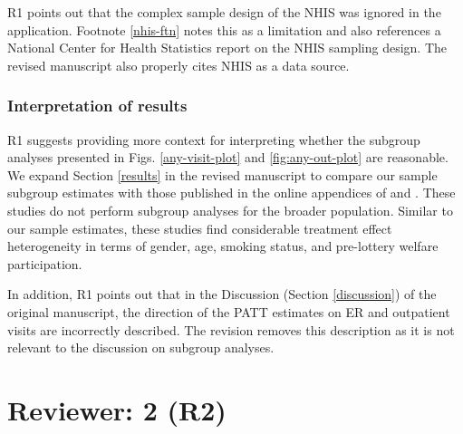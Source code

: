 \documentclass[hidelinks,12pt,letterpaper]{article}
\begin{document}
R1 points out that the complex sample design of the NHIS was ignored in the application. Footnote \ref{nhis-ftn} notes this as a limitation and also references a National Center for Health Statistics report on the NHIS sampling design. The revised manuscript also properly cites NHIS as a data source. 

\subsubsection{Interpretation of results}

R1 suggests providing more context for interpreting whether the subgroup analyses presented in Figs. \ref{any-visit-plot} and \ref{fig:any-out-plot} are reasonable. We expand Section \ref{results} in the revised manuscript to compare our sample subgroup estimates with those published in the online appendices of \citep{Taubman} and \citet{NBERw22363}. These studies do not perform subgroup analyses for the broader population. Similar to our sample estimates, these studies find considerable treatment effect heterogeneity in terms of gender, age, smoking status, and pre-lottery welfare participation. 


In addition, R1 points out that in the Discussion (Section \ref{discussion}) of the original manuscript, the direction of the PATT estimates on ER and outpatient visits are incorrectly described. The revision removes this description as it is not relevant to the discussion on subgroup analyses. 

\section{Reviewer: 2 (R2)}
\end{document}
